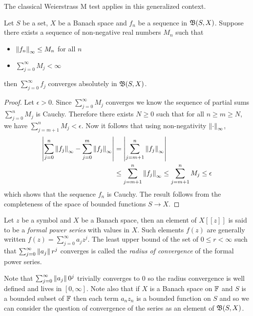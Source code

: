 The classical Weierstrass M test applies in this generalized context.
\begin{thm}\label{banach:WeierstrassMTest}Let $S$ be a set, $X$ be a
  Banach space and $f_n$ be a sequence in $\mathfrak{B}(S, X)$.   Suppose there exists a
  sequence of non-negative real numbers $M_n$ such that
  \begin{itemize}
  \item[(i)] $\left \lVert f_n \right \rVert_\infty \leq M_n$ for all $n$
   \item[(ii)] $\sum_{j=0}^\infty M_j < \infty$
   \end{itemize}
then $\sum_{j=0}^\infty f_j$ converges absolutely in $\mathfrak{B}(S, X)$.
\end{thm}
\begin{proof}
Let $\epsilon>0$.   Since $\sum_{j=0}^\infty M_j$ converges we know
the sequence of partial sums $\sum_{j=0}^n M_j$ is Cauchy.   Therefore
there exists $N \geq 0$ such that for all $n \geq m \geq N$, we have
$\sum_{j=m+1}^n M_j < \epsilon$.
Now it follows that using non-negativity $\left \lVert \cdot \right \rVert_\infty$,
\begin{align*}
  \left \vert \sum_{j=0}^n \left \lVert f_j \right \rVert_\infty - \sum_{j=0}^m
  \left \lVert f_j \right \rVert_\infty \right \vert &= \left \vert \sum_{j=m+1}^n \left \lVert f_j \right \rVert_\infty \right \vert \\
  &\leq \sum_{j=m+1}^n \left \lVert f_j \right \rVert_\infty \leq  \sum_{j=m+1}^n M_j
    \leq \epsilon
\end{align*}
which shows that the sequence $f_n$ is Cauchy.   The result follows
from the completeness of the space of bounded functions $S \to X$.
\end{proof}

\begin{defn}Let $z$ be a symbol and $X$ be a Banach space, then an
  element of $X[[z]]$ is said to be a \emph{formal power series} with
  values in $X$.   Such elements $f(z)$ are generally written $f(z) =
  \sum_{j=0}^\infty a_j z^j$.  The least upper bound of the set of
  $0 \leq r < \infty$ such that  $\sum_{j=0}^\infty \left \lVert a_j \right \rVert r^j$
        converges is called the \emph{radius of convergence} of the formal power series.
\end{defn}
Note that $\sum_{j=0}^\infty \left \lVert a_j \right \rVert 0^j$ trivially converges to
$0$ so the radius convergence is well defined and lives in $[0,
\infty]$.   Note also that if $X$ is a Banach space on $\mathbb{F}$ and
$S$ is a bounded subset of $\mathbb{F}$ then each term $a_n z_n$ is a
bounded function on $S$ and so we can consider the question of
convergence of the series as an element of $\mathfrak{B}(S, X)$.

